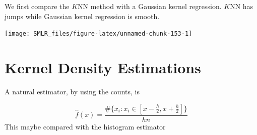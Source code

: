 \documentclass[
]{book}
\newenvironment{Shaded}{\begin{snugshade}}{\end{snugshade}}
\newcommand{\AttributeTok}[1]{\textcolor[rgb]{0.13,0.29,0.53}{#1}}
\newcommand{\CommentTok}[1]{\textcolor[rgb]{0.56,0.35,0.01}{\textit{#1}}}
\newcommand{\ControlFlowTok}[1]{\textcolor[rgb]{0.13,0.29,0.53}{\textbf{#1}}}
\newcommand{\DecValTok}[1]{\textcolor[rgb]{0.00,0.00,0.81}{#1}}
\newcommand{\FloatTok}[1]{\textcolor[rgb]{0.00,0.00,0.81}{#1}}
\newcommand{\FunctionTok}[1]{\textcolor[rgb]{0.13,0.29,0.53}{\textbf{#1}}}
\newcommand{\NormalTok}[1]{#1}
\newcommand{\OtherTok}[1]{\textcolor[rgb]{0.56,0.35,0.01}{#1}}
\newcommand{\SpecialCharTok}[1]{\textcolor[rgb]{0.81,0.36,0.00}{\textbf{#1}}}
\newcommand{\StringTok}[1]{\textcolor[rgb]{0.31,0.60,0.02}{#1}}
\theoremstyle{definition}
\theoremstyle{definition}
\theoremstyle{definition}
\theoremstyle{definition}
\theoremstyle{remark}
\begin{document}
We first compare the \(K\)NN method with a Gaussian kernel regression. \(K\)NN has jumps while Gaussian kernel regression is smooth.

\begin{center}\texttt{[image: SMLR\_files/figure-latex/unnamed-chunk-153-1]} \end{center}

\hypertarget{kernel-density-estimations}{%
\section{Kernel Density Estimations}\label{kernel-density-estimations}}

A natural estimator, by using the counts, is

\[\widehat f(x) = \frac{\#\big\{x_i: x_i \in [x - \frac{h}{2}, x + \frac{h}{2}]\big\}}{h n}\]
This maybe compared with the histogram estimator

\begin{Shaded}
\end{Shaded}
\end{document}
